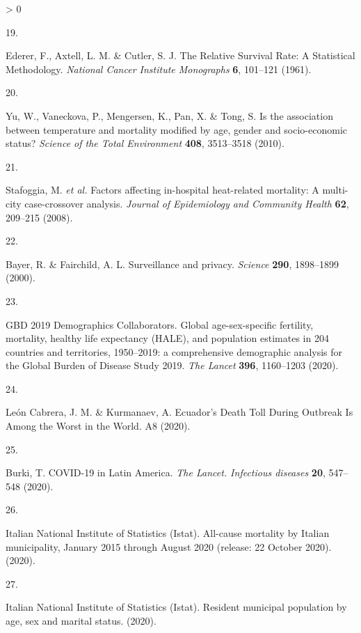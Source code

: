 \documentclass[
]{article}
\newlength{\cslhangindent}
\newlength{\csllabelwidth}
\newenvironment{CSLReferences}[2] %
 {%
  \setlength{\parindent}{0pt}
  \ifodd #1 \everypar{\setlength{\hangindent}{\cslhangindent}}\ignorespaces\fi
  \ifnum #2 > 0
  \setlength{\parskip}{#2\baselineskip}
  \fi
 }%
 {}
\newcommand{\CSLLeftMargin}[1]{\parbox[t]{\csllabelwidth}{#1}}
\newcommand{\CSLRightInline}[1]{\parbox[t]{\linewidth - \csllabelwidth}{#1}\break}
\begin{document}
\begin{CSLReferences}{0}{0}
\leavevmode\hypertarget{ref-Ederer1961}{}%
\CSLLeftMargin{19. }
\CSLRightInline{Ederer, F., Axtell, L. M. \& Cutler, S. J. {The Relative Survival Rate: A Statistical Methodology}. \emph{National Cancer Institute Monographs} \textbf{6}, 101--121 (1961).}

\leavevmode\hypertarget{ref-Yu2010}{}%
\CSLLeftMargin{20. }
\CSLRightInline{Yu, W., Vaneckova, P., Mengersen, K., Pan, X. \& Tong, S. {Is the association between temperature and mortality modified by age, gender and socio-economic status?} \emph{Science of the Total Environment} \textbf{408}, 3513--3518 (2010).}

\leavevmode\hypertarget{ref-Stafoggia2008}{}%
\CSLLeftMargin{21. }
\CSLRightInline{Stafoggia, M. \emph{et al.} {Factors affecting in-hospital heat-related mortality: A multi-city case-crossover analysis}. \emph{Journal of Epidemiology and Community Health} \textbf{62}, 209--215 (2008).}

\leavevmode\hypertarget{ref-Bayer2000}{}%
\CSLLeftMargin{22. }
\CSLRightInline{Bayer, R. \& Fairchild, A. L. {Surveillance and privacy}. \emph{Science} \textbf{290}, 1898--1899 (2000).}

\leavevmode\hypertarget{ref-GBD2019DemographicsCollaborators2020}{}%
\CSLLeftMargin{23. }
\CSLRightInline{GBD 2019 Demographics Collaborators. {Global age-sex-specific fertility, mortality, healthy life expectancy (HALE), and population estimates in 204 countries and territories, 1950--2019: a comprehensive demographic analysis for the Global Burden of Disease Study 2019}. \emph{The Lancet} \textbf{396}, 1160--1203 (2020).}

\leavevmode\hypertarget{ref-LeonCabrera2020}{}%
\CSLLeftMargin{24. }
\CSLRightInline{León Cabrera, J. M. \& Kurmanaev, A. {Ecuador's Death Toll During Outbreak Is Among the Worst in the World}. A8 (2020).}

\leavevmode\hypertarget{ref-Burki2020}{}%
\CSLLeftMargin{25. }
\CSLRightInline{Burki, T. {COVID-19 in Latin America}. \emph{The Lancet. Infectious diseases} \textbf{20}, 547--548 (2020).}

\leavevmode\hypertarget{ref-ItalianNationalInstituteofStatisticsIstat2020a}{}%
\CSLLeftMargin{26. }
\CSLRightInline{Italian National Institute of Statistics (Istat). {All-cause mortality by Italian municipality, January 2015 through August 2020 (release: 22 October 2020).} (2020).}

\leavevmode\hypertarget{ref-ItalianNationalInstituteofStatisticsIstat2020}{}%
\CSLLeftMargin{27. }
\CSLRightInline{Italian National Institute of Statistics (Istat). {Resident municipal population by age, sex and marital status}. (2020).}


\end{CSLReferences}
\end{document}
